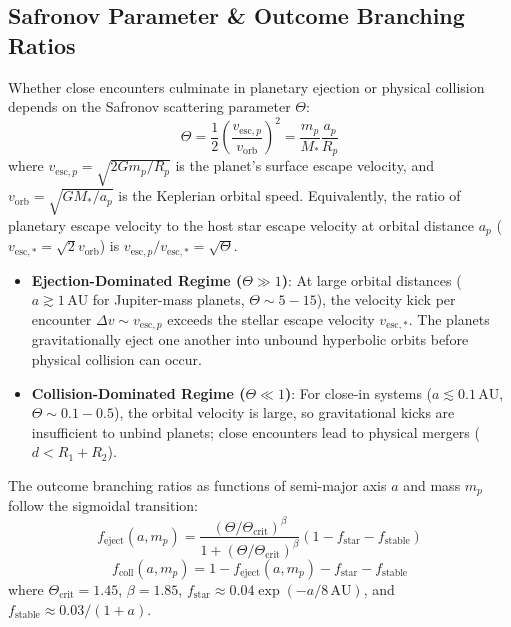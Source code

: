 \documentclass[11pt,a4paper]{article}
\begin{document}
\subsection{Safronov Parameter \& Outcome Branching Ratios}
Whether close encounters culminate in planetary ejection or physical collision depends on the Safronov scattering parameter $\Theta$:
\begin{equation}
\Theta = \frac{1}{2} \left( \frac{v_{\text{esc},p}}{v_{\text{orb}}} \right)^2 = \frac{m_p}{M_*} \frac{a_p}{R_p}
\label{eq:safronov}
\end{equation}
where $v_{\text{esc},p} = \sqrt{2 G m_p / R_p}$ is the planet's surface escape velocity, and $v_{\text{orb}} = \sqrt{G M_* / a_p}$ is the Keplerian orbital speed. Equivalently, the ratio of planetary escape velocity to the host star escape velocity at orbital distance $a_p$ ($v_{\text{esc},*} = \sqrt{2} v_{\text{orb}}$) is $v_{\text{esc},p} / v_{\text{esc},*} = \sqrt{\Theta}$.
\begin{itemize}
    \item \textbf{Ejection-Dominated Regime ($\Theta \gg 1$)}: At large orbital distances ($a \gtrsim 1\,\text{AU}$ for Jupiter-mass planets, $\Theta \sim 5-15$), the velocity kick per encounter $\Delta v \sim v_{\text{esc},p}$ exceeds the stellar escape velocity $v_{\text{esc},*}$. The planets gravitationally eject one another into unbound hyperbolic orbits before physical collision can occur.
    \item \textbf{Collision-Dominated Regime ($\Theta \ll 1$)}: For close-in systems ($a \lesssim 0.1\,\text{AU}$, $\Theta \sim 0.1-0.5$), the orbital velocity is large, so gravitational kicks are insufficient to unbind planets; close encounters lead to physical mergers ($d < R_1 + R_2$).
\end{itemize}
The outcome branching ratios as functions of semi-major axis $a$ and mass $m_p$ follow the sigmoidal transition:
\begin{equation}
f_{\text{eject}}(a, m_p) = \frac{(\Theta / \Theta_{\text{crit}})^\beta}{1 + (\Theta / \Theta_{\text{crit}})^\beta} (1 - f_{\text{star}} - f_{\text{stable}})
\label{eq:f_eject}
\end{equation}
\begin{equation}
f_{\text{coll}}(a, m_p) = 1 - f_{\text{eject}}(a, m_p) - f_{\text{star}} - f_{\text{stable}}
\label{eq:f_coll}
\end{equation}
where $\Theta_{\text{crit}} = 1.45$, $\beta = 1.85$, $f_{\text{star}} \approx 0.04 \exp(-a/8\,\text{AU})$, and $f_{\text{stable}} \approx 0.03 / (1 + a)$.
\end{document}
